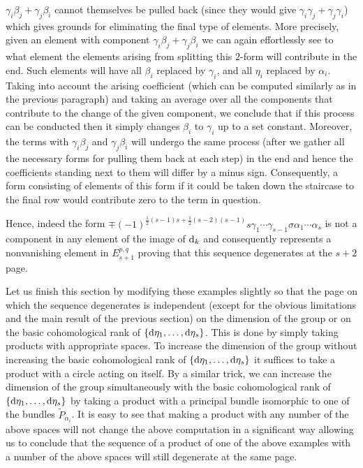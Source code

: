 \documentclass[pdftex]{sigma}
\numberwithin{equation}{section}
\theoremstyle{definition}
\begin{document}
$\gamma_i\beta_j+\gamma_j\beta_i$ cannot themselves be pulled back (since they would give $\gamma_i\gamma_j+\gamma_j\gamma_i$) which gives grounds for eliminating the final type of elements. More precisely, given an element with component $\gamma_i\beta_j+\gamma_j\beta_i$ we can again effortlessly see to what element the elements arising from splitting this $2$-form will contribute in the end. Such elements will have all $\beta_i$ replaced by $\gamma_i$, and all $\eta_i$ replaced by $\alpha_i$. Taking into account the arising coefficient (which can be computed similarly as in the previous paragraph) and taking an average over all the components that contribute to the change of the given component, we conclude that if this process can be conducted then it simply changes $\beta_i$ to $\gamma_i$ up to a set constant. Moreover, the terms with $\gamma_i\beta_j$ and $\gamma_j\beta_i$ will undergo the same process (after we gather all the necessary forms for pulling them back at each step) in the end and hence the coefficients standing next to them will differ by a minus sign. Consequently, a form consisting of elements of this form if it could be taken down the staircase to the final row would contribute zero to the term in question.

Hence, indeed the form
$\mp (-1)^{\frac{1}{2}(s-1)s+\frac{1}{2}(s-2)(s-1)}s\gamma_1\cdots \gamma_{s-1}\sigma\alpha_1\cdots \alpha_s$
is not a component in any element of the image of ${\rm d}_k$ and consequently represents a nonvanishing element in $E_{s+1}^{p,q}$ proving that this sequence degenerates at the $s+2$ page.

Let us finish this section by modifying these examples slightly so that the page on which the sequence degenerates is independent (except for the obvious limitations and the main result of the previous section) on the dimension of the group or on the basic cohomological rank of $\{{\rm d}\eta_1,\dots,{\rm d}\eta_s\}$. This is done by simply taking products with appropriate spaces. To increase the dimension of the group without increasing the basic cohomological rank of $\{{\rm d}\eta_1,\dots,{\rm d}\eta_s\}$ it suffices to take a product with a circle acting on itself. By a similar trick, we can increase the dimension of the group simultaneously with the basic cohomological rank of $\{{\rm d}\eta_1,\dots,{\rm d}\eta_s\}$ by taking a product with a principal bundle isomorphic to one of the bundles $\tilde{P}_{\alpha_i}$. It is easy to see that making a product with any number of the above spaces will not change the above computation in a significant way allowing us to conclude that the sequence of a product of one of the above examples with a number of the above spaces will still degenerate at the same page.
\end{document}
